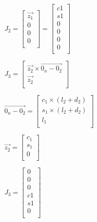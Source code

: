  \begin{figure}[H]
\centering

$J_2=
\begin{bmatrix}
\overrightarrow{z_1}\\
0\\
0\\
0\\
\end{bmatrix}  
=
\begin{bmatrix}

c1\\
s1\\
0\\
0\\
0\\
0\\
\end{bmatrix}  
$
 
  \end{figure}


\begin{figure}[H]
\centering

$J_3=
\begin{bmatrix}
\overrightarrow{z_2}\times \overrightarrow{0_n-0_2}\\
\overrightarrow{z_2}\\
\end{bmatrix}  $
 
  \end{figure}

\begin{figure}[H] 
\centering

$\overrightarrow{0_n-0_2}=
\begin{bmatrix}
c_1\times(l_2+d_2)\\
s_1\times(l_2+d_2) \\
l_1\\
\end{bmatrix}  $
 
  \end{figure}

\begin{figure}[H]
\centering

$\overrightarrow{z_2}=
\begin{bmatrix}
c_1\\
s_1 \\
0\\
\end{bmatrix}  $
 
  \end{figure}


\begin{figure}[H]
\centering

$J_3=
\begin{bmatrix}
0\\
0 \\
0\\
c1\\
s1\\
0\\
\end{bmatrix}  $
 
  \end{figure}


